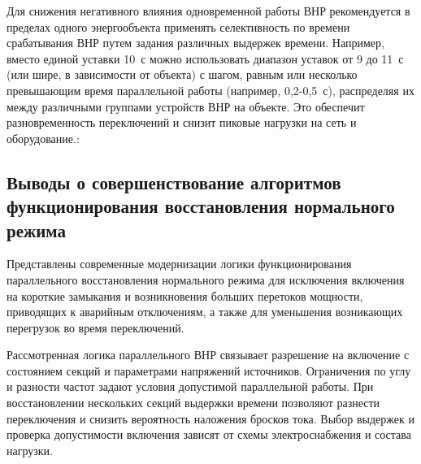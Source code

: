 Для снижения негативного влияния одновременной работы ВНР рекомендуется в пределах
одного энергообъекта применять селективность по времени срабатывания ВНР путем задания
различных выдержек времени. Например, вместо единой уставки 10~с можно использовать
диапазон уставок от 9 до 11~с (или шире, в зависимости от объекта) с шагом, равным или
несколько превышающим время параллельной работы (например, 0,2-0,5~с), распределяя их
между различными группами устройств ВНР на объекте. Это обеспечит разновременность
переключений и снизит пиковые нагрузки на сеть и оборудование.:\par\vspace{0.2cm}

\subsection{Выводы о совершенствование алгоритмов функционирования восстановления нормального режима}
\label{sec:ch02_vnr_conclusions}

Представлены современные модернизации логики функционирования параллельного
восстановления нормального режима для исключения включения на короткие замыкания и
возникновения больших перетоков мощности, приводящих к аварийным отключениям, а также
для уменьшения возникающих перегрузок во время переключений.\par\vspace{0.2cm}

Рассмотренная логика параллельного ВНР связывает разрешение на включение с состоянием
секций и параметрами напряжений источников. Ограничения по углу и разности частот задают
условия допустимой параллельной работы. При восстановлении нескольких секций выдержки
времени позволяют разнести переключения и снизить вероятность наложения бросков тока.
Выбор выдержек и проверка допустимости включения зависят от схемы электроснабжения и
состава нагрузки.\par\vspace{0.2cm}


